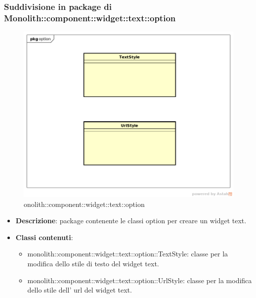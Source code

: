 \subsubsection{Suddivisione in package  di Monolith::component::widget::text::option}
\label{monolith::component::widget::text::option}
\begin{figure}[H]
	\centering
	\includegraphics[scale=0.5]{Sezioni/imgPackage/component_widget_text_option.png}
	\caption{onolith::component::widget::text::option}
\end{figure}
\begin{itemize}
	\item{\textbf{Descrizione}}: package contenente le classi option per creare un widget text.
	\item{\textbf{Classi contenuti}}:
	\begin{itemize}
	\item{monolith::component::widget::text::option::TextStyle}: classe per la modifica dello stile di testo del widget text.
	\item{monolith::component::widget::text::option::UrlStyle}: classe per la modifica dello stile dell' url del widget text.
	\end{itemize}
\end{itemize}






\newpage